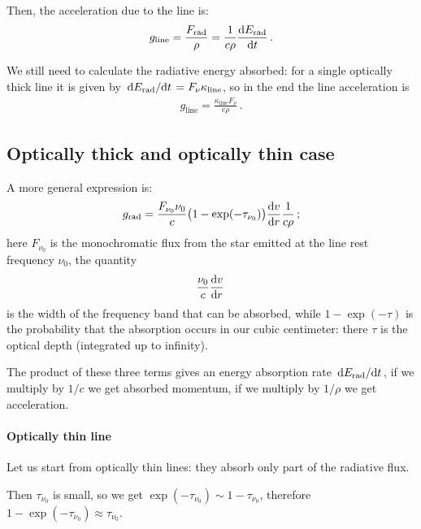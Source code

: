 \documentclass[main.tex]{subfiles}
\begin{document}
Then, the acceleration due to the line is:
%
\begin{align} \label{eq:line-acceleration-general}
  g _{\text{line}} = \frac{F _{\text{rad}}}{\rho }
  = \frac{1}{c \rho } \dv{E _{\text{rad}}}{t}
\,.
\end{align}
 
We still need to calculate the radiative energy absorbed: for a single optically thick line it is given by \(\dv*{E _{\text{rad}}}{t} = F_{\nu } \kappa _{\text{line}}\), so in the end the line acceleration is 
%
\begin{align}
g _{\text{line}} = \frac{\kappa _{\text{line}} F_{\nu }}{c \rho }
\,.
\end{align}
%

\subsection{Optically thick and optically thin case}

A more general expression is:
%
\begin{align}
  g _{\text{rad}} = \frac{F_{\nu_0} \nu_0 }{c} \qty(1 - \exp(- \tau_{\nu_0 }) ) \dv{v}{r} \frac{1}{c \rho }
\,;
\end{align}
%
here \(F_{\nu_0}\) is the monochromatic flux from the star emitted at the line rest frequency \(\nu_0 \), the quantity 
%
\begin{align}
  \frac{\nu_0}{c} \dv{v}{r}
\,
\end{align}
%
is the width of the frequency band that can be absorbed, while \(1 - \exp(-\tau ) \) is the probability that the absorption occurs in our cubic centimeter: there \(\tau \) is the optical depth (integrated up to infinity).

The product of these three terms gives an energy absorption rate \(\dv*{E _{\text{rad}}}{t}\), if we multiply by \(1/c\) we get absorbed momentum, if we multiply by \(1/ \rho \) we get acceleration.

\paragraph{Optically thin line}

Let us start from optically thin lines: they absorb only part of the radiative flux.

Then \(\tau_{\nu_0 } \) is small, so we get \(\exp(-\tau_{\nu_0 }) \sim 1- \tau_{\nu_0 } \), therefore \(1- \exp(-\tau_{\nu_0 }) \approx \tau_{\nu_0 } \).
\end{document}
